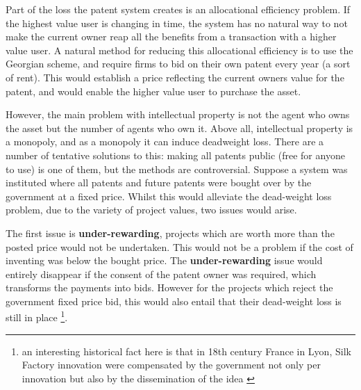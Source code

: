 \documentclass[12pt]{report}
\numberwithin{equation}{section}
\begin{document}
Part of the loss the patent system creates is an allocational efficiency problem. If the highest value user is changing in time, the system has no natural way to not make the current owner reap all the benefits from a transaction with a higher value user. A natural method for reducing this allocational efficiency is to use the Georgian scheme, and require firms to bid on their own patent every year (a sort of rent). This would establish a price reflecting the current owners value for the patent, and would enable the higher value user to purchase the asset. 

\newpage
However, the main problem with intellectual property is not the agent who owns the asset but the number of agents who own it. Above all, intellectual property is a monopoly, and as a monopoly it can induce deadweight loss. There are a number of tentative solutions to this: making all patents public (free for anyone to use) is one of them, but the methods are controversial. Suppose a system was instituted where all patents and future patents were bought over by the government at a fixed price. Whilst this would alleviate the dead-weight loss problem, due to the variety of project values, two issues would arise. 

The first issue is \textbf{under-rewarding}, projects which are worth more than the posted price would not be undertaken. This would not be a problem if the cost of inventing was below the bought price. The \textbf{under-rewarding} issue would entirely disappear if the consent of the patent owner was required, which transforms the payments into bids. However for the projects which reject the government fixed price bid, this would also entail that their dead-weight loss is still in place \footnote{an interesting historical fact here is that in 18th century France in Lyon, Silk Factory innovation were compensated by the government not only per innovation but also by the dissemination of the idea \cite{foray2013patent}}.
\end{document}
